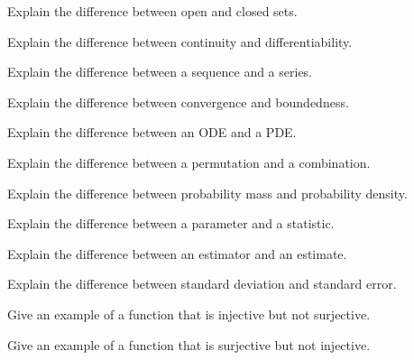 \begin{exercise}[1]
Explain the difference between open and closed sets.
\end{exercise}

\begin{exercise}[1]
Explain the difference between continuity and differentiability.
\end{exercise}

\begin{exercise}[1]
Explain the difference between a sequence and a series.
\end{exercise}

\begin{exercise}[1]
Explain the difference between convergence and boundedness.
\end{exercise}

\begin{exercise}[1]
Explain the difference between an ODE and a PDE.
\end{exercise}

\begin{exercise}[1]
Explain the difference between a permutation and a combination.
\end{exercise}

\begin{exercise}[1]
Explain the difference between probability mass and probability density.
\end{exercise}

\begin{exercise}[1]
Explain the difference between a parameter and a statistic.
\end{exercise}

\begin{exercise}[1]
Explain the difference between an estimator and an estimate.
\end{exercise}

\begin{exercise}[1]
Explain the difference between standard deviation and standard error.
\end{exercise}

\begin{exercise}[2]
Give an example of a function that is injective but not surjective.
\end{exercise}

\begin{exercise}[2]
Give an example of a function that is surjective but not injective.
\end{exercise}

